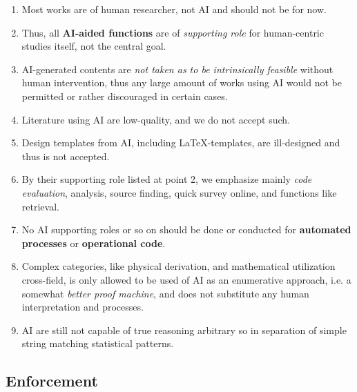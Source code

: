 \documentclass[10pt,a4paper]{article}
\begin{document}
\begin{enumerate}
    \item Most works are of human researcher, not AI and should not be for now. 
    \item Thus, all \textbf{AI-aided functions} are of \textit{supporting role} for human-centric studies itself, not the central goal. 
    \item AI-generated contents are \textit{not taken as to be intrinsically feasible} without human intervention, thus any large amount of works using AI would not be permitted or rather discouraged in certain cases. 
    \item Literature using AI are low-quality, and we do not accept such. 
    \item Design templates from AI, including \LaTeX -templates, are ill-designed and thus is not accepted. 
    \item By their supporting role listed at point 2, we emphasize mainly \textit{code evaluation}, analysis, source finding, quick survey online, and functions like retrieval. 
    \item No AI supporting roles or so on should be done or conducted for \textbf{automated processes} or \textbf{operational code}. 
    \item Complex categories, like physical derivation, and mathematical utilization cross-field, is only allowed to be used of AI as an enumerative approach, i.e. a somewhat \textit{better proof machine}, and does not substitute any human interpretation and processes. 
    \item AI are still not capable of true reasoning arbitrary so in separation of simple string matching statistical patterns. 
\end{enumerate}

\subsection{Enforcement}
\end{document}
